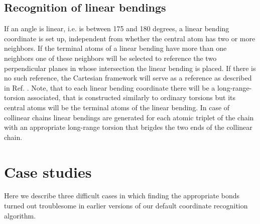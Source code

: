 \documentclass[prl,aps,preprint,superbib,12pt]{revtex4}
\begin{document}
\subsection{Recognition of linear bendings} 
If an angle is linear, i.e. is between 175 and 180 degrees, 
a linear bending coordinate is set up,
independent from whether the central atom has two or more neighbors.
If the terminal atoms of a linear bending have more than one
neighbors one of these neighbors will be selected to reference
the two perpendicular planes in whose intersection the linear bending is
placed. If there is no such reference, the Cartesian framework will
serve as a reference as described in Ref. .
Note, that to each linear bending coordinate there will be
a long-range-torsion associated, that is constructed similarly to
ordinary torsions but its central atoms will be the terminal atoms
of the linear bending.
In case of collinear chains linear bendings are generated for each 
atomic triplet of the chain with an appropriate long-range torsion
that brigdes the two ends of the collinear chain.

\section{Case studies}
Here we describe three difficult cases in which finding the 
appropriate bonds turned out troublesome in earlier versions
of our default coordinate recognition algorithm.
\end{document}
